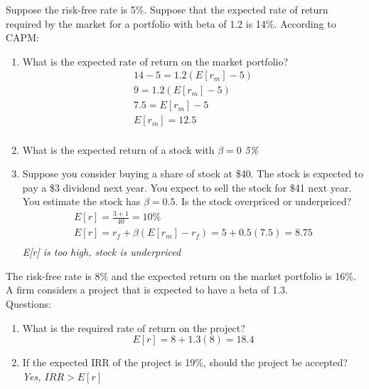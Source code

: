 \documentclass[11pt]{article}
\theoremstyle{definition}
\begin{document}
    \begin{shaded}

    Suppose the risk-free rate is 5\%.   Suppose that the expected rate of return 
    required by the market for a portfolio with beta of 1.2 is 14\%.  According to CAPM:
    \begin{enumerate}
        \item What is the expected rate of return on the market portfolio?
        \begin{align*}
            14 -5 = 1.2(E[r_m] - 5)\\
            9 = 1.2(E[r_m] - 5)\\
            7.5 = E[r_m] - 5\\
            E[r_m] = 12.5\\
        \end{align*}
        \item What is the expected return of a stock with $\beta=0$
        \textit{5\%}
        \item Suppose you consider buying a share of stock at \$40.  
        The stock is expected to pay a \$3 dividend next year. 
        You expect to sell the stock for \$41 next year.  
        You estimate the stock has $\beta=0.5$.   Is the stock overpriced or 
        underpriced?
        \begin{align*}
            E[r] = \frac{3+1}{40} = 10\%\\
            E[r] = r_f + \beta(E[r_m]-r_f) = 5 + 0.5(7.5) = 8.75\\
        \end{align*}
        \textit{E[r] is too high, stock is underpriced}
    \end{enumerate}
    \end{shaded}

    \begin{shaded}
    The risk-free rate is 8\% and the expected return on the market portfolio is 16\%. A firm considers a project that is expected to have a beta of 1.3.\\
    \vspace{1em}
    Questions:
    \begin{enumerate}
        \item What is the required rate of return on the project?
            $$E[r] = 8+1.3(8) = 18.4$$
        \item If the expected IRR of the project is 19\%, should the project be accepted?
        \textit{Yes, $IRR > E[r]$}
    \end{enumerate}
    \vfill
 
    \end{shaded}
\end{document}
